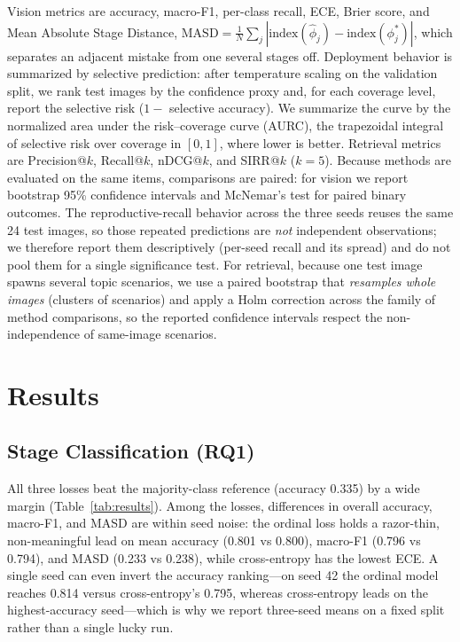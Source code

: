 \documentclass{llncs}
\begin{document}
Vision metrics are accuracy, macro-F1, per-class recall, ECE, Brier score, and Mean Absolute Stage Distance, $\mathrm{MASD}=\frac{1}{N}\sum_j|\mathrm{index}(\hat{\phi}_j)-\mathrm{index}(\phi_j^*)|$, which separates an adjacent mistake from one several stages off. Deployment behavior is summarized by selective prediction: after temperature scaling on the validation split, we rank test images by the confidence proxy and, for each coverage level, report the selective risk ($1-$ selective accuracy). We summarize the curve by the normalized area under the risk--coverage curve (AURC), the trapezoidal integral of selective risk over coverage in $[0,1]$, where lower is better. Retrieval metrics are Precision@$k$, Recall@$k$, nDCG@$k$, and SIRR@$k$ ($k=5$). Because methods are evaluated on the same items, comparisons are paired: for vision we report bootstrap 95\% confidence intervals \cite{efron1993bootstrap} and McNemar's test \cite{mcnemar1947note} for paired binary outcomes. The reproductive-recall behavior across the three seeds reuses the same 24 test images, so those repeated predictions are \emph{not} independent observations; we therefore report them descriptively (per-seed recall and its spread) and do not pool them for a single significance test. For retrieval, because one test image spawns several topic scenarios, we use a paired bootstrap that \emph{resamples whole images} (clusters of scenarios) and apply a Holm correction across the family of method comparisons, so the reported confidence intervals respect the non-independence of same-image scenarios.

\section{Results}

\subsection{Stage Classification (RQ1)}

All three losses beat the majority-class reference (accuracy 0.335) by a wide margin (Table~\ref{tab:results}). Among the losses, differences in overall accuracy, macro-F1, and MASD are within seed noise: the ordinal loss holds a razor-thin, non-meaningful lead on mean accuracy (0.801 vs 0.800), macro-F1 (0.796 vs 0.794), and MASD (0.233 vs 0.238), while cross-entropy has the lowest ECE. A single seed can even invert the accuracy ranking---on seed 42 the ordinal model reaches 0.814 versus cross-entropy's 0.795, whereas cross-entropy leads on the highest-accuracy seed---which is why we report three-seed means on a fixed split rather than a single lucky run.
\end{document}
